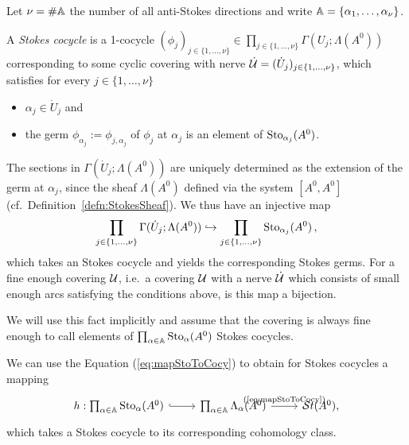 \begin{defn}\label{defn:stokesCocycle}
  Let $\nu=\#\mathbb{A}$ the number of all anti-Stokes directions and write
  $\mathbb{A}=\{\alpha_1,\dots,\alpha_\nu\}$.

  A \emph{Stokes cocycle} is a 1-cocycle $(\phi_j)_{j\in\{1,\dots,\nu\}}\in
  \prod_{j\in\{1,\dots,\nu\}}\Gamma(U_j;\Lambda(A^0))$ corresponding to some
  cyclic covering with nerve $\dot{\mathcal{U}}=(\dot U_j)_{j\in\{1,\dots,\nu\}}$,
  which satisfies for every $j\in\{1,\dots,\nu\}$
  \begin{itemize}
    \item $\alpha_j\in\dot U_j$ and
    \item the germ $\phi_{\alpha_j}:=\phi_{j,\alpha_j}$ of $\phi_j$ at
      $\alpha_j$ is an element of $\operatorname{Sto}_{\alpha_j}(A^0)$.
  \end{itemize}
  \begin{s-rem}\label{rem:inclusionGermRemark}
    \PROBLEM[refactor!]
    The sections in $\Gamma(\dot U_j;\Lambda(A^0))$ are uniquely
    determined as the extension of the germ at $\alpha_j$, since the sheaf
    $\Lambda(A^0)$ defined via the system $[A^0,A^0]$
    (cf.\ Definition~\ref{defn:StokesSheaf}).
    We thus have an injective map
    \[
      \prod_{j\in\{1,\dots,\nu\}}\Gamma(\dot U_j;\Lambda(A^0))
      \hookrightarrow
      \prod_{j\in\{1,\dots,\nu\}}\operatorname{Sto}_{\alpha_j}(A^0) \,,
    \]
    which takes an Stokes cocycle and yields the corresponding Stokes germs.
    For a fine enough covering $\mathcal{U}$, i.e.\ a covering $\mathcal{U}$ with a nerve
    $\dot{\mathcal{U}}$ which consists of small enough arcs satisfying the conditions
    above, is this map a bijection.

    We will use this fact implicitly and assume that the covering is always
    fine enough to call elements of $\prod_{\alpha\in\mathbb{A}}\operatorname{Sto}_\alpha(A^0)$
    Stokes cocycles.
  \end{s-rem}
\end{defn}
We can use the Equation (\ref{eq:mapStoToCocy}) to obtain for Stokes cocycles
a mapping
\[ \begin{tikzcd}
    h:\prod_{\alpha\in\A}\Sto_\alpha(A^0)
    \rar[hook]&
    \prod_{\alpha\in\A}\Lambda_\alpha(A^0)
    \rar{\text{(\ref{eq:mapStoToCocy})}}&
    \St(A^0),
\end{tikzcd} \]
which takes a Stokes cocycle to its corresponding cohomology class.
